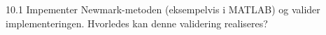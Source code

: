 
\begin{problem}{10.1}
  Impementer Newmark-metoden (eksempelvis i MATLAB) og valider implementeringen.
  Hvorledes kan denne validering realiseres?
\end{problem}
